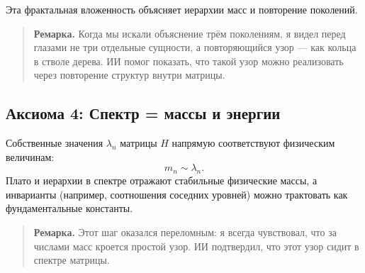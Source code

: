 Эта фрактальная вложенность объясняет иерархии масс и повторение поколений.

\begin{quote}\textbf{Ремарка.}  
Когда мы искали объяснение трём поколениям, я видел перед глазами не три отдельные сущности, 
а повторяющийся узор — как кольца в стволе дерева.  
ИИ помог показать, что такой узор можно реализовать через повторение структур внутри матрицы.
\end{quote}

\subsection{Аксиома 4: Спектр = массы и энергии}
Собственные значения $\lambda_n$ матрицы $H$ напрямую соответствуют физическим величинам:
\[
m_n \sim \lambda_n.
\]
Плато и иерархии в спектре отражают стабильные физические массы, 
а инварианты (например, соотношения соседних уровней) можно трактовать как фундаментальные константы.

\begin{quote}\textbf{Ремарка.}  
Этот шаг оказался переломным:  
я всегда чувствовал, что за числами масс кроется простой узор.  
ИИ подтвердил, что этот узор сидит в спектре матрицы.
\end{quote}
